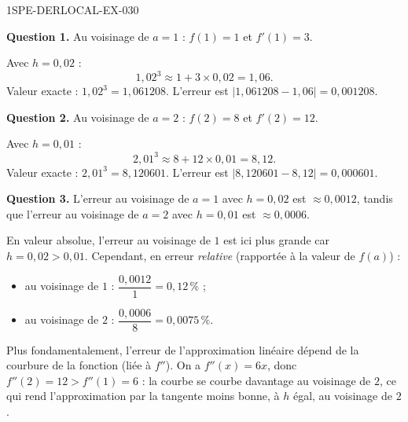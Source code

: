 \begin{corrige}{1SPE-DERLOCAL-EX-030}

\textbf{Question 1.} Au voisinage de $a = 1$ : $f(1) = 1$ et $f'(1) = 3$.

Avec $h = 0{,}02$ :
\[
1{,}02^3 \approx 1 + 3 \times 0{,}02 = \boxed{1{,}06}.
\]
Valeur exacte : $1{,}02^3 = 1{,}061208$. L'erreur est $|1{,}061208 - 1{,}06| = 0{,}001208$.

\textbf{Question 2.} Au voisinage de $a = 2$ : $f(2) = 8$ et $f'(2) = 12$.

Avec $h = 0{,}01$ :
\[
2{,}01^3 \approx 8 + 12 \times 0{,}01 = \boxed{8{,}12}.
\]
Valeur exacte : $2{,}01^3 = 8{,}120601$. L'erreur est $|8{,}120601 - 8{,}12| = 0{,}000601$.

\textbf{Question 3.} L'erreur au voisinage de $a = 1$ avec $h = 0{,}02$ est $\approx 0{,}0012$, tandis que l'erreur au voisinage de $a = 2$ avec $h = 0{,}01$ est $\approx 0{,}0006$.

En valeur absolue, l'erreur au voisinage de $1$ est ici plus grande car $h = 0{,}02 > 0{,}01$. Cependant, en erreur \emph{relative} (rapportée à la valeur de $f(a)$) :
\begin{itemize}
  \item au voisinage de $1$ : $\dfrac{0{,}0012}{1} = 0{,}12\,\%$ ;
  \item au voisinage de $2$ : $\dfrac{0{,}0006}{8} = 0{,}0075\,\%$.
\end{itemize}

Plus fondamentalement, l'erreur de l'approximation linéaire dépend de la courbure de la fonction (liée à $f''$). On a $f''(x) = 6x$, donc $f''(2) = 12 > f''(1) = 6$ : la courbe se courbe davantage au voisinage de $2$, ce qui rend l'approximation par la tangente moins bonne, à $h$ égal, au voisinage de $2$.

\end{corrige}
